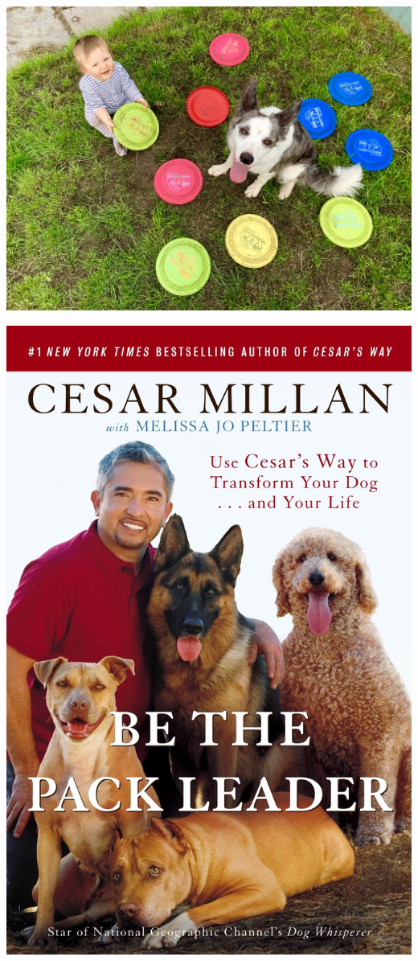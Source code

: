 \documentclass{beamer}
\begin{document}
    \begin{frame}
        \centering
        \includegraphics[width=.95\textwidth]{static/jj_and_riggs.jpg}
    \end{frame}

    \begin{frame}
        \centering
        \includegraphics[height=.95\textheight]{static/cesar.jpg}
    \end{frame}
\end{document}
